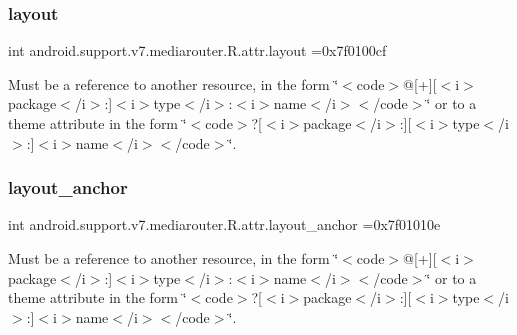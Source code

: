 \subsubsection{\texorpdfstring{layout}{layout}}
{\footnotesize\ttfamily int android.\+support.\+v7.\+mediarouter.\+R.\+attr.\+layout =0x7f0100cf\hspace{0.3cm}{\ttfamily [static]}}

Must be a reference to another resource, in the form \char`\"{}$<$code$>$@\mbox{[}+\mbox{]}\mbox{[}$<$i$>$package$<$/i$>$\+:\mbox{]}$<$i$>$type$<$/i$>$\+:$<$i$>$name$<$/i$>$$<$/code$>$\char`\"{} or to a theme attribute in the form \char`\"{}$<$code$>$?\mbox{[}$<$i$>$package$<$/i$>$\+:\mbox{]}\mbox{[}$<$i$>$type$<$/i$>$\+:\mbox{]}$<$i$>$name$<$/i$>$$<$/code$>$\char`\"{}. \mbox{\label{classandroid_1_1support_1_1v7_1_1mediarouter_1_1R_1_1attr_af69c1f64204816025b4664fd0a292592}} 
\subsubsection{\texorpdfstring{layout\+\_\+anchor}{layout\_anchor}}
{\footnotesize\ttfamily int android.\+support.\+v7.\+mediarouter.\+R.\+attr.\+layout\+\_\+anchor =0x7f01010e\hspace{0.3cm}{\ttfamily [static]}}

Must be a reference to another resource, in the form \char`\"{}$<$code$>$@\mbox{[}+\mbox{]}\mbox{[}$<$i$>$package$<$/i$>$\+:\mbox{]}$<$i$>$type$<$/i$>$\+:$<$i$>$name$<$/i$>$$<$/code$>$\char`\"{} or to a theme attribute in the form \char`\"{}$<$code$>$?\mbox{[}$<$i$>$package$<$/i$>$\+:\mbox{]}\mbox{[}$<$i$>$type$<$/i$>$\+:\mbox{]}$<$i$>$name$<$/i$>$$<$/code$>$\char`\"{}. \mbox{\label{classandroid_1_1support_1_1v7_1_1mediarouter_1_1R_1_1attr_a9aed551fd040263a028c9e8fa00edde7}} 
